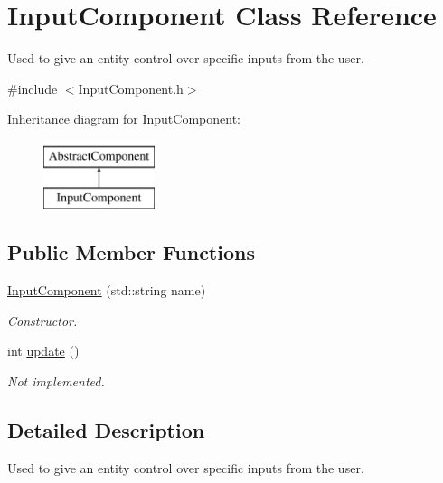 \hypertarget{class_input_component}{\section{Input\-Component Class Reference}
\label{d7/dd5/class_input_component}
}


Used to give an entity control over specific inputs from the user.  




{\ttfamily \#include $<$Input\-Component.\-h$>$}

Inheritance diagram for Input\-Component\-:\begin{figure}[H]
\begin{center}
\leavevmode
\includegraphics[height=2.000000cm]{d7/dd5/class_input_component}
\end{center}
\end{figure}
\subsection*{Public Member Functions}
\begin{DoxyCompactItemize}
\item 
\hyperlink{class_input_component_a903992fd159592568f3e365f2c625bd5}{Input\-Component} (std\-::string name)
\begin{DoxyCompactList}\small\item\em Constructor. \end{DoxyCompactList}\item 
\hypertarget{class_input_component_a1577c43e70f7e7f4ac6647fb4a8563fa}{int \hyperlink{class_input_component_a1577c43e70f7e7f4ac6647fb4a8563fa}{update} ()}\label{d7/dd5/class_input_component_a1577c43e70f7e7f4ac6647fb4a8563fa}

\begin{DoxyCompactList}\small\item\em Not implemented. \end{DoxyCompactList}\end{DoxyCompactItemize}


\subsection{Detailed Description}
Used to give an entity control over specific inputs from the user. 

